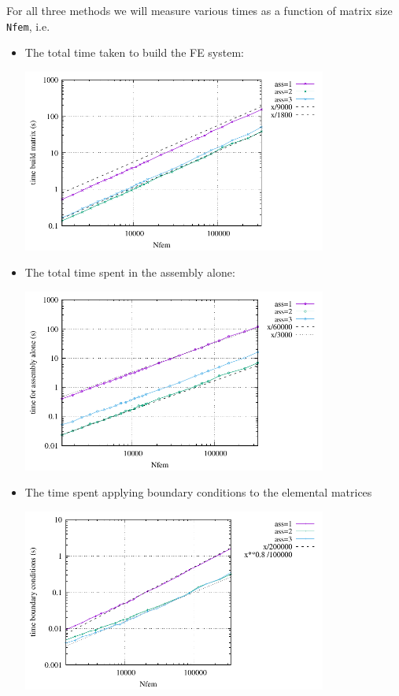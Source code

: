 For all three methods we will measure various times as a function 
of matrix size \lstinline{Nfem}, i.e. 

\begin{itemize}
\item The total time taken to build the FE system: 
\begin{center}
\includegraphics[width=10cm]{python_codes/fieldstone_181/RESULTS/times_build.pdf}
\end{center}
\item The total time spent in the assembly alone:
\begin{center}
\includegraphics[width=10cm]{python_codes/fieldstone_181/RESULTS/times_assembly.pdf}
\end{center}

\item The time spent applying boundary conditions to the elemental matrices 
\begin{center}
\includegraphics[width=10cm]{python_codes/fieldstone_181/RESULTS/times_bc.pdf}
\end{center}


\end{itemize}
